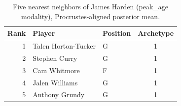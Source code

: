 \begin{table}[htbp]
  \centering\small
  \begin{tabular}{rllc}
    \toprule
    Rank & Player & Position & Archetype \\
    \midrule
    1 & Talen Horton-Tucker & G & 1 \\
    2 & Stephen Curry & G & 1 \\
    3 & Cam Whitmore & F & 1 \\
    4 & Jalen Williams & G & 1 \\
    5 & Anthony Grundy & G & 1 \\
    \bottomrule
  \end{tabular}
  \caption{Five nearest neighbors of James Harden (peak_age modality), Procrustes-aligned posterior mean.}
  \label{tab:James_Harden_neighbors_peak_age}
\end{table}

